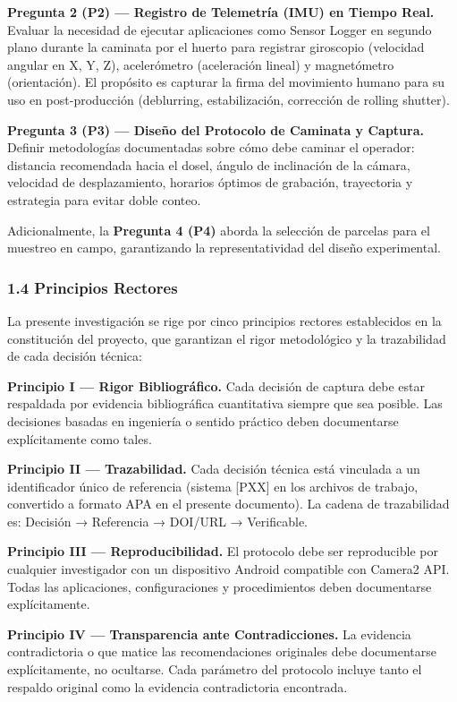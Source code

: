 \textbf{Pregunta 2 (P2) — Registro de Telemetría (IMU) en Tiempo Real.} Evaluar la necesidad de ejecutar aplicaciones como Sensor Logger en segundo plano durante la caminata por el huerto para registrar giroscopio (velocidad angular en X, Y, Z), acelerómetro (aceleración lineal) y magnetómetro (orientación). El propósito es capturar la firma del movimiento humano para su uso en post-producción (deblurring, estabilización, corrección de rolling shutter).


\textbf{Pregunta 3 (P3) — Diseño del Protocolo de Caminata y Captura.} Definir metodologías documentadas sobre cómo debe caminar el operador: distancia recomendada hacia el dosel, ángulo de inclinación de la cámara, velocidad de desplazamiento, horarios óptimos de grabación, trayectoria y estrategia para evitar doble conteo.


Adicionalmente, la \textbf{Pregunta 4 (P4)} aborda la selección de parcelas para el muestreo en campo, garantizando la representatividad del diseño experimental.


\subsubsection{1.4 Principios Rectores}


La presente investigación se rige por cinco principios rectores establecidos en la constitución del proyecto, que garantizan el rigor metodológico y la trazabilidad de cada decisión técnica:


\textbf{Principio I — Rigor Bibliográfico.} Cada decisión de captura debe estar respaldada por evidencia bibliográfica cuantitativa siempre que sea posible. Las decisiones basadas en ingeniería o sentido práctico deben documentarse explícitamente como tales.


\textbf{Principio II — Trazabilidad.} Cada decisión técnica está vinculada a un identificador único de referencia (sistema [PXX] en los archivos de trabajo, convertido a formato APA en el presente documento). La cadena de trazabilidad es: Decisión → Referencia → DOI/URL → Verificable.


\textbf{Principio III — Reproducibilidad.} El protocolo debe ser reproducible por cualquier investigador con un dispositivo Android compatible con Camera2 API. Todas las aplicaciones, configuraciones y procedimientos deben documentarse explícitamente.


\textbf{Principio IV — Transparencia ante Contradicciones.} La evidencia contradictoria o que matice las recomendaciones originales debe documentarse explícitamente, no ocultarse. Cada parámetro del protocolo incluye tanto el respaldo original como la evidencia contradictoria encontrada.



